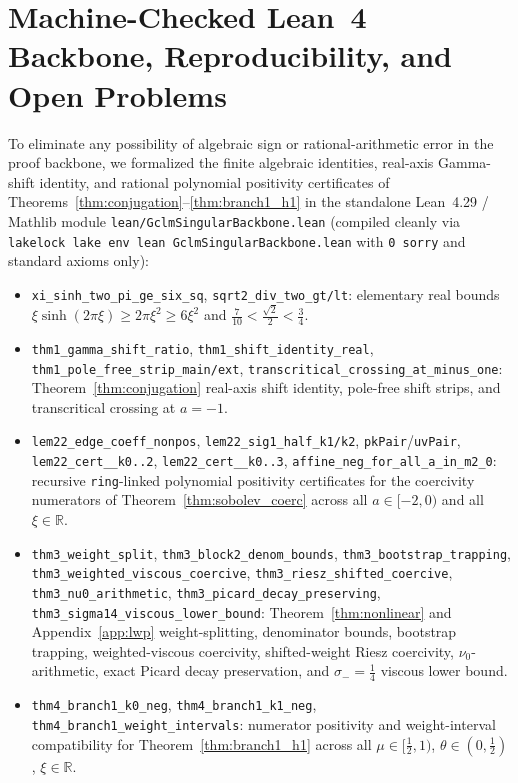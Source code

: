 \documentclass[11pt,a4paper]{article}
\begin{document}
\section{Machine-Checked Lean~4 Backbone, Reproducibility, and Open Problems}\label{sec:lean_open}

To eliminate any possibility of algebraic sign or rational-arithmetic error in the proof backbone, we formalized the finite algebraic identities, real-axis Gamma-shift identity, and rational polynomial positivity certificates of Theorems~\ref{thm:conjugation}--\ref{thm:branch1_h1} in the standalone Lean~4.29 / Mathlib module \texttt{lean/GclmSingularBackbone.lean} (compiled cleanly via \texttt{lakelock lake env lean GclmSingularBackbone.lean} with \texttt{0~sorry} and standard axioms only):
\begin{itemize}
  \item \texttt{xi\_sinh\_two\_pi\_ge\_six\_sq}, \texttt{sqrt2\_div\_two\_gt/lt}: elementary real bounds $\xi\sinh(2\pi\xi) \ge 2\pi\xi^2 \ge 6\xi^2$ and $\frac{7}{10} < \frac{\sqrt{2}}{2} < \frac{3}{4}$.
  \item \texttt{thm1\_gamma\_shift\_ratio}, \texttt{thm1\_shift\_identity\_real}, \texttt{thm1\_pole\_free\_strip\_main/ext}, \texttt{transcritical\_crossing\_at\_minus\_one}: Theorem~\ref{thm:conjugation} real-axis shift identity, pole-free shift strips, and transcritical crossing at $a = -1$.
  \item \texttt{lem22\_edge\_coeff\_nonpos}, \texttt{lem22\_sig1\_half\_k1/k2}, \texttt{pkPair}/\texttt{uvPair}, \texttt{lem22\_cert\_\_k0..2}, \texttt{lem22\_cert\_\_k0..3}, \texttt{affine\_neg\_for\_\allowbreak all\_a\_in\_m2\_0}: recursive \texttt{ring}-linked polynomial positivity certificates for the coercivity numerators of Theorem~\ref{thm:sobolev_coerc} across all $a \in [-2,0)$ and all $\xi \in \mathbb{R}$.
  \item \texttt{thm3\_\allowbreak weight\_split}, \texttt{thm3\_\allowbreak block2\_denom\_bounds}, \texttt{thm3\_\allowbreak bootstrap\_trapping}, \texttt{thm3\_\allowbreak weighted\_viscous\_coercive}, \texttt{thm3\_\allowbreak riesz\_shifted\_coercive}, \texttt{thm3\_\allowbreak nu0\_arithmetic}, \texttt{thm3\_\allowbreak picard\_decay\_preserving}, \texttt{thm3\_\allowbreak sigma14\_viscous\_lower\_bound}: Theorem~\ref{thm:nonlinear} and Appendix~\ref{app:lwp} weight-splitting, denominator bounds, bootstrap trapping, weighted-viscous coercivity, shifted-weight Riesz coercivity, $\nu_0$-arithmetic, exact Picard decay preservation, and $\sigma_- = \frac{1}{4}$ viscous lower bound.
  \item \texttt{thm4\_branch1\_k0\_neg}, \texttt{thm4\_branch1\_k1\_neg}, \texttt{thm4\_branch1\_weight\_intervals}: numerator positivity and weight-interval compatibility for Theorem~\ref{thm:branch1_h1} across all $\mu \in [\frac{1}{2},1)$, $\theta \in (0,\frac{1}{2})$, $\xi \in \mathbb{R}$.
\end{itemize}
\end{document}
